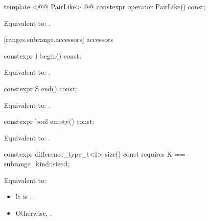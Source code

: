 %
\begin{itemdecl}
template <@@ PairLike>
  @@
constexpr operator PairLike() const;
\end{itemdecl}

\begin{itemdescr}
\pnum
\effects Equivalent to: .
\end{itemdescr}

[ranges.subrange.accessors]{ accessors}

%
\begin{itemdecl}
constexpr I begin() const;
\end{itemdecl}

\begin{itemdescr}
\pnum
\effects Equivalent to: .
\end{itemdescr}

%
\begin{itemdecl}
constexpr S end() const;
\end{itemdecl}

\begin{itemdescr}
\pnum
\effects Equivalent to: .
\end{itemdescr}

%
\begin{itemdecl}
constexpr bool empty() const;
\end{itemdecl}

\begin{itemdescr}
\pnum
\effects Equivalent to: .
\end{itemdescr}

%
\begin{itemdecl}
constexpr difference_type_t<I> size() const
  requires K == subrange_kind::sized;
\end{itemdecl}

\begin{itemdescr}
\pnum
\effects Equivalent to:
\begin{itemize}
\item It  is , .
\item Otherwise, .
\end{itemize}
\end{itemdescr}

